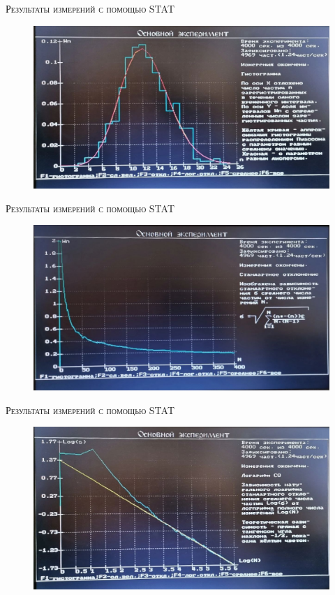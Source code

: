 \documentclass{beamer}%
\begin{document}
\begin{frame}{\textsc{Результаты измерений с помощью STAT}}
    \begin{figure}[ht]
        \includegraphics[width=1.0\linewidth]{images/res.jpg}
    \end{figure}
\end{frame}

\begin{frame}{\textsc{Результаты измерений с помощью STAT}}
    \begin{figure}[ht]
        \includegraphics[width=1.0\linewidth]{images/sigma_n.jpg}
    \end{figure}
\end{frame}

\begin{frame}{\textsc{Результаты измерений с помощью STAT}}
    \begin{figure}[h]
        \includegraphics[width=1.0\linewidth]{images/sigma_n_1.jpg}
    \end{figure}
\end{frame}    
\end{document}
